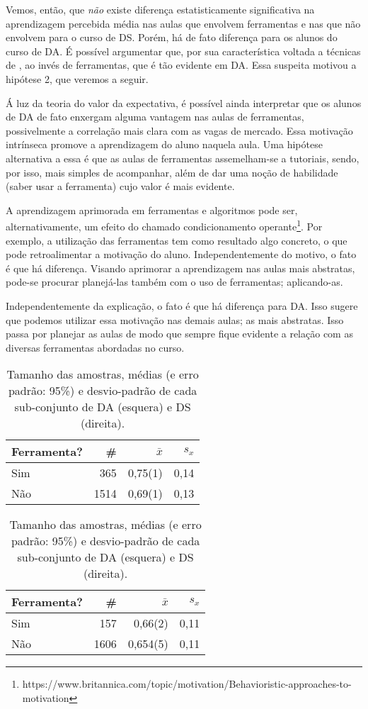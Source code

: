 Vemos, então, que \emph{não} existe diferença estatisticamente significativa na aprendizagem percebida média nas aulas que envolvem ferramentas e nas que não envolvem para o curso de DS. Porém, há de fato diferença para os alunos do curso de DA.
É possível argumentar que, por sua característica voltada a técnicas de , ao invés de ferramentas, que é tão evidente em DA.
Essa suspeita motivou a hipótese 2, que veremos a seguir.

Á luz da teoria do valor da expectativa, é possível ainda interpretar que os alunos de DA de fato enxergam alguma vantagem nas aulas de ferramentas, possivelmente a correlação mais clara com as vagas de mercado.
Essa motivação intrínseca promove a aprendizagem do aluno naquela aula.
Uma hipótese alternativa a essa é que as aulas de ferramentas assemelham-se a tutoriais, sendo, por isso, mais simples de acompanhar, além de dar uma noção de habilidade (saber usar a ferramenta) cujo valor é mais evidente.

A aprendizagem aprimorada em ferramentas e algoritmos pode ser, alternativamente, um efeito do chamado condicionamento operante\footnote{https://www.britannica.com/topic/motivation/Behavioristic-approaches-to-motivation}. Por exemplo, a utilização das ferramentas tem como resultado algo concreto, o que pode retroalimentar a motivação do aluno. Independentemente do motivo, o fato é que há diferença. Visando aprimorar a aprendizagem nas aulas mais abstratas, pode-se procurar planejá-las também com o uso de ferramentas; aplicando-as.

Independentemente da explicação, o fato é que há diferença para DA.
Isso sugere que podemos utilizar essa motivação nas demais aulas; as mais abstratas.
Isso passa por planejar as aulas de modo que sempre fique evidente a relação com as diversas ferramentas abordadas no curso.

\begin{table}
	\caption{Tamanho das amostras, médias (e erro padrão: 95\%) e desvio-padrão de cada sub-conjunto de DA (esquera) e DS (direita).}
	\begin{minipage}{0.45\textwidth}
		\begin{tabular}{lrrr}
			\toprule
			Ferramenta? & \# & $\bar{x}$ & $s_x$ \\
			\midrule
			Sim &  365 & 0,75(1) & 0,14 \\
			Não & 1514 & 0,69(1) & 0,13 \\
			\bottomrule
		\end{tabular}
	\end{minipage}\hfill
	\begin{minipage}{0.45\textwidth}
		\begin{tabular}{lrrr}
			\toprule
			Ferramenta? & \# & $\bar{x}$ & $s_x$ \\
			\midrule
			Sim &  157 & 0,66(2) & 0,11 \\
			Não & 1606 & 0,654(5) & 0,11 \\
			\bottomrule
		\end{tabular}
	\end{minipage}
\end{table}

